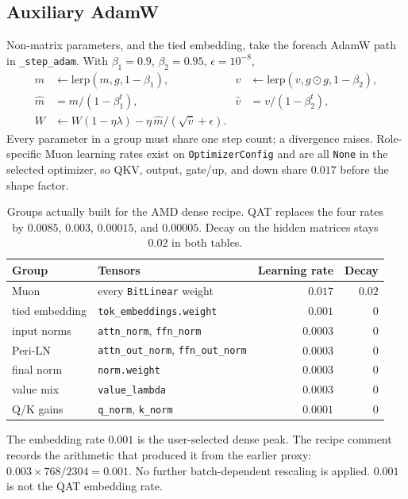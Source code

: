 \documentclass[11pt]{article}
\DeclareRobustCommand{\code}[1]{\texttt{#1}}
\begin{document}
\subsection{Auxiliary AdamW}

Non-matrix parameters, and the tied embedding, take the foreach AdamW path
in \code{\_step\_adam}. With \(\beta_1=0.9\), \(\beta_2=0.95\),
\(\epsilon=10^{-8}\),
\begin{align*}
m &\leftarrow \mathrm{lerp}(m,g,1-\beta_1),&
v &\leftarrow \mathrm{lerp}(v,g\odot g,1-\beta_2),\\
\hat{m} &= m/(1-\beta_1^{t}),&
\hat{v} &= v/(1-\beta_2^{t}),\\
W &\leftarrow W(1-\eta\lambda)
   - \eta\,\hat{m}/(\sqrt{\hat{v}}+\epsilon).
\end{align*}
Every parameter in a group must share one step count; a divergence raises.
Role-specific Muon learning rates exist on \code{OptimizerConfig} and are
all \code{None} in the selected optimizer, so QKV, output, gate/up, and down
share \(0.017\) before the shape factor.

\begin{table}[t]
\centering
\caption{Groups actually built for the AMD dense recipe. QAT replaces the
four rates by \(0.0085\), \(0.003\), \(0.00015\), and \(0.00005\). Decay on
the hidden matrices stays \(0.02\) in both tables.}
\label{tab:lrs}
\begin{tabular}{@{}llrr@{}}
\toprule
Group & Tensors & Learning rate & Decay \\
\midrule
Muon & every \code{BitLinear} weight & \(0.017\) & \(0.02\) \\
tied embedding & \code{tok\_embeddings.weight} & \(0.001\) & \(0\) \\
input norms & \code{attn\_norm}, \code{ffn\_norm} & \(0.0003\) & \(0\) \\
Peri-LN & \code{attn\_out\_norm}, \code{ffn\_out\_norm} & \(0.0003\) & \(0\) \\
final norm & \code{norm.weight} & \(0.0003\) & \(0\) \\
value mix & \code{value\_lambda} & \(0.0003\) & \(0\) \\
Q/K gains & \code{q\_norm}, \code{k\_norm} & \(0.0001\) & \(0\) \\
\bottomrule
\end{tabular}
\end{table}

The embedding rate \(0.001\) is the user-selected dense peak. The recipe
comment records the arithmetic that produced it from the earlier proxy:
\(0.003\times 768/2304=0.001\). No further batch-dependent rescaling is
applied. \(0.001\) is not the QAT embedding rate.
\end{document}
